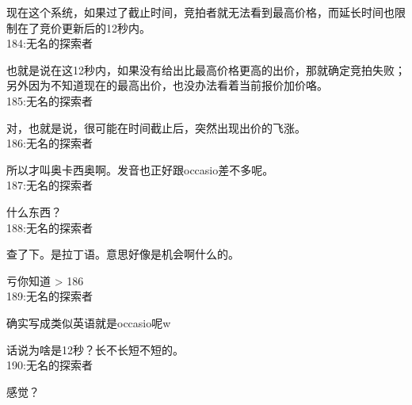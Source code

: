 现在这个系统，如果过了截止时间，竞拍者就无法看到最高价格，而延长时间也限制在了竞价更新后的12秒内。\\

184:无名的探索者

也就是说在这12秒内，如果没有给出比最高价格更高的出价，那就确定竞拍失败；另外因为不知道现在的最高出价，也没办法看着当前报价加价咯。\\

185:无名的探索者

对，也就是说，很可能在时间截止后，突然出现出价的飞涨。\\

186:无名的探索者

所以才叫奥卡西奥啊。发音也正好跟occasio差不多呢。\\

187:无名的探索者

什么东西？\\

188:无名的探索者

查了下。是拉丁语。意思好像是机会啊什么的。

亏你知道 > 186\\

189:无名的探索者

确实写成类似英语就是occasio呢w

话说为啥是12秒？长不长短不短的。\\

190:无名的探索者

感觉？\\

